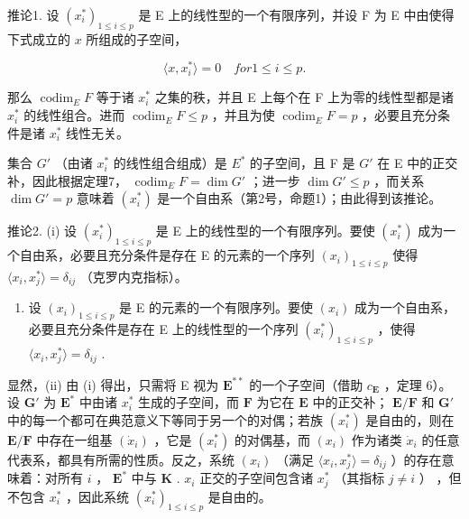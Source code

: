 推论1. 设 \((x_{i}^{*})_{1\leqslant i\leqslant p}\) 是 E 上的线性型的一个有限序列，并设 F 为 E 中由使得下式成立的 \(x\) 所组成的子空间，

\[
\langle x, x _ {i} ^ {*} \rangle = 0 \quad for 1 \leqslant i \leqslant p.
\]

那么 \(\operatorname{codim}_{E} F\) 等于诸 \(x_{i}^{*}\) 之集的秩，并且 E 上每个在 F 上为零的线性型都是诸 \(x_{i}^{*}\) 的线性组合。进而 \(\operatorname{codim}_{E} F \leqslant p\) ，并且为使 \(\operatorname{codim}_{E} F = p\) ，必要且充分条件是诸 \(x_{i}^{*}\) 线性无关。

集合 \(G'\) （由诸 \(x_{i}^{*}\) 的线性组合组成）是 \(E^{*}\) 的子空间，且 F 是 \(G'\) 在 E 中的正交补，因此根据定理7， \(\operatorname{codim}_{E} F = \dim G'\) ；进一步 \(\dim G' \leqslant p\) ，而关系 \(\dim G' = p\) 意味着 \((x_{i}^{*})\) 是一个自由系（第2号，命题1）；由此得到该推论。

推论2. (i) 设 \((x_{i}^{*})_{1\leqslant i\leqslant p}\) 是 E 上的线性型的一个有限序列。要使 \((x_{i}^{*})\) 成为一个自由系，必要且充分条件是存在 E 的元素的一个序列 \((x_{i})_{1\leqslant i\leqslant p}\) 使得 \(\langle x_i,x_j^*\rangle = \delta_{ij}\) （克罗内克指标）。

\begin{enumerate}
\def\labelenumi{(\roman{enumi})}
\setcounter{enumi}{1}
\tightlist
\item
  设 \((x_{i})_{1\leqslant i\leqslant p}\) 是 E 的元素的一个有限序列。要使 \((x_{i})\) 成为一个自由系，必要且充分条件是存在 E 上的线性型的一个序列 \((x_{i}^{*})_{1\leqslant i\leqslant p}\) ，使得 \(\langle x_i,x_j^*\rangle = \delta_{ij}\) .
\end{enumerate}

显然，(ii) 由 (i) 得出，只需将 E 视为 \(\mathbf{E}^{**}\) 的一个子空间（借助 \(c_{\mathbf{E}}\) ，定理 6）。设 \(\mathbf{G}'\) 为 \(\mathbf{E}^*\) 中由诸 \(x_{i}^{*}\) 生成的子空间，而 \(\mathbf{F}\) 为它在 \(\mathbf{E}\) 中的正交补； \(\mathbf{E} / \mathbf{F}\) 和 \(\mathbf{G}'\) 中的每一个都可在典范意义下等同于另一个的对偶；若族 \((x_{i}^{*})\) 是自由的，则在 \(\mathbf{E} / \mathbf{F}\) 中存在一组基 \((\dot{x}_i)\) ，它是 \((x_{i}^{*})\) 的对偶基，而 \((x_{i})\) 作为诸类 \(\dot{x}_{i}\) 的任意代表系，都具有所需的性质。反之，系统 \((x_{i})\) （满足 \(\langle x_{i}, x_{j}^{*} \rangle = \delta_{ij}\) ）的存在意味着：对所有 \(i\) ， \(\mathbf{E}^*\) 中与 \(\mathbf{K}\) . \(x_{i}\) 正交的子空间包含诸 \(x_{j}^{*}\) （其指标 \(j \neq i\) ） ，但不包含 \(x_{i}^{*}\) ，因此系统 \((x_{i}^{*})_{1 \leqslant i \leqslant p}\) 是自由的。

